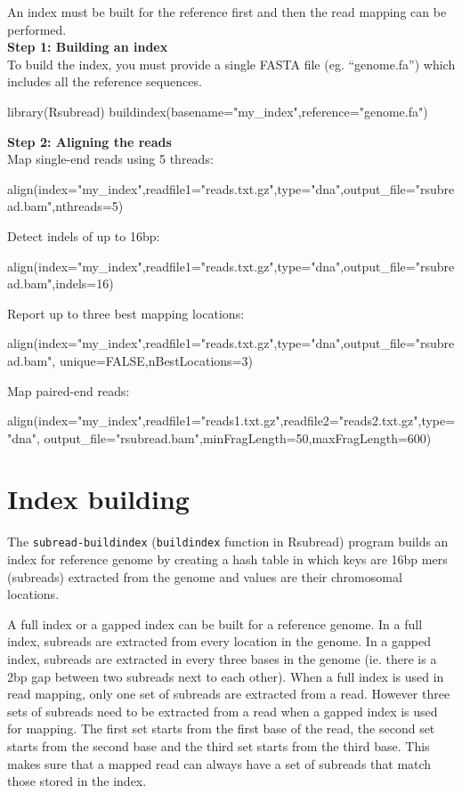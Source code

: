 \documentclass[12pt]{report}
\newcommand{\code}[1]{{\small\texttt{#1}}}
\newcommand{\Rsubread}{\textsf{Rsubread}}
\begin{document}
An index must be built for the reference first and then the read mapping can be performed.\\

{\noindent\bf Step 1: Building an index}\\

\noindent To build the index, you must provide a single FASTA file (eg. ``genome.fa'') which includes all the reference sequences.

\begin{Rcode}
library(Rsubread)
buildindex(basename="my_index",reference="genome.fa")
\end{Rcode}

{\noindent\bf Step 2: Aligning the reads}\\

\noindent Map single-end reads using 5 threads:
\begin{Rcode}
align(index="my_index",readfile1="reads.txt.gz",type="dna",output_file="rsubread.bam",nthreads=5)
\end{Rcode}

\noindent Detect indels of up to 16bp:
\begin{Rcode}
align(index="my_index",readfile1="reads.txt.gz",type="dna",output_file="rsubread.bam",indels=16)
\end{Rcode}

\noindent Report up to three best mapping locations:
\begin{Rcode}
align(index="my_index",readfile1="reads.txt.gz",type="dna",output_file="rsubread.bam",
unique=FALSE,nBestLocations=3)
\end{Rcode}

\noindent Map paired-end reads:
\begin{Rcode}
align(index="my_index",readfile1="reads1.txt.gz",readfile2="reads2.txt.gz",type="dna",
output_file="rsubread.bam",minFragLength=50,maxFragLength=600)
\end{Rcode}


\section{Index building}
\label{sec:index}

The \code{subread-buildindex} (\code{buildindex} function in \Rsubread) program builds an index for reference genome by creating a hash table in which keys are 16bp mers (subreads) extracted from the genome and values are their chromosomal locations.

A full index or a gapped index can be built for a reference genome.
In a full index, subreads are extracted from every location in the genome.
In a gapped index, subreads are extracted in every three bases in the genome (ie. there is a 2bp gap between two subreads next to each other).
When a full index is used in read mapping, only one set of subreads are extracted from a read.
However three sets of subreads need to be extracted from a read when a gapped index is used for mapping.
The first set starts from the first base of the read, the second set starts from the second base and the third set starts from the third base.
This makes sure that a mapped read can always have a set of subreads that match those stored in the index.
\end{document}
